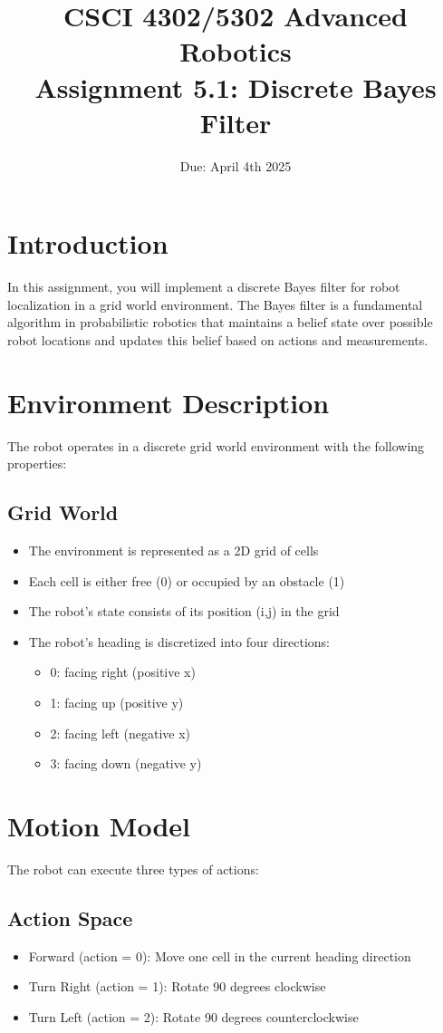 \documentclass[11pt]{article}
\title{CSCI 4302/5302 Advanced Robotics\\
Assignment 5.1: Discrete Bayes Filter}
\author{Due: April 4th 2025}
\date{}
\begin{document}
\maketitle

\section{Introduction}
In this assignment, you will implement a discrete Bayes filter for robot localization in a grid world environment. The Bayes filter is a fundamental algorithm in probabilistic robotics that maintains a belief state over possible robot locations and updates this belief based on actions and measurements.

\section{Environment Description}
The robot operates in a discrete grid world environment with the following properties:

\subsection{Grid World}
\begin{itemize}
    \item The environment is represented as a 2D grid of cells
    \item Each cell is either free (0) or occupied by an obstacle (1)
    \item The robot's state consists of its position (i,j) in the grid
    \item The robot's heading is discretized into four directions:
        \begin{itemize}
            \item 0: facing right (positive x)
            \item 1: facing up (positive y)
            \item 2: facing left (negative x)
            \item 3: facing down (negative y)
        \end{itemize}
\end{itemize}

\section{Motion Model}
The robot can execute three types of actions:

\subsection{Action Space}
\begin{itemize}
    \item Forward (action = 0): Move one cell in the current heading direction
    \item Turn Right (action = 1): Rotate 90 degrees clockwise
    \item Turn Left (action = 2): Rotate 90 degrees counterclockwise
\end{itemize}
\end{document}
